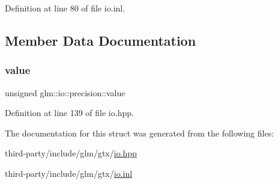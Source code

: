 Definition at line 80 of file io.\+inl.



\subsection{Member Data Documentation}
\mbox{\label{structglm_1_1io_1_1precision_a43da772dff9a209768c63f1220d52074}} 
\subsubsection{\texorpdfstring{value}{value}}
{\footnotesize\ttfamily unsigned glm\+::io\+::precision\+::value}



Definition at line 139 of file io.\+hpp.



The documentation for this struct was generated from the following files\+:\begin{DoxyCompactItemize}
\item 
third-\/party/include/glm/gtx/\hyperlink{io_8hpp}{io.\+hpp}\item 
third-\/party/include/glm/gtx/\hyperlink{io_8inl}{io.\+inl}\end{DoxyCompactItemize}

